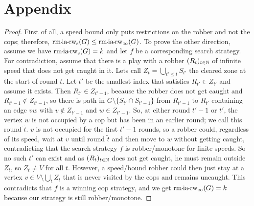 \section{Appendix}


\TheoremInvActRobbermonotonicity*
\begin{proof}
    First of all, a speed bound only puts restrictions on the robber and not the cops; therefore, $\rmiacopwidth{s}(G) \leq \rmiacopwidth{\infty}(G)$. To prove the other direction, assume we have $\rmiacopwidth{s}(G)=k$ and let $f$ be a corresponding search strategy. For contradiction, assume that there is a play with a robber $(R_t)_{t\in\mathbb{N}}$ of infinite speed that does not get caught in it. Lets call $Z_t = \bigcup_{t'\leq t}S_{t'}$ the cleared zone at the start of round $t$. Let $t'$ be the smallest index that satisfies $R_{t'} \in Z_{t'}$ and assume it exists. Then $R_{t'} \in Z_{t'-1}$, because the robber does not get caught and $R_{t'-1} \notin Z_{t'-1}$, so there is path in $G\setminus \{S_{t'} \cap S_{t'-1}\}$ from $R_{t'-1}$ to $R_{t'}$ containing an edge $vw$ with $v\notin Z_{t'-1}$ and $w\in Z_{t'-1}$.
    So, at either round $t'-1$ or $t'$, the vertex $w$ is not occupied by a cop but has been in an earlier round; we call this round $\tilde{t}$. $v$ is not occupied for the first $t'-1$ rounds, so a robber could, regardless of its speed, wait at $v$ until round $\tilde{t}$ and then move to $w$ without getting caught, contradicting that the search strategy $f$ is robber\-/monotone for finite speeds. So no such $t'$ can exist and as $(R_t)_{t\in\mathbb{N}}$ does not get caught, he must remain outside $Z_t$, so $Z_t \neq V$ for all $t$. However, a speed\-/bound robber could then just stay at a vertex $v\in V\setminus \bigcup_{t}Z_{t}$ that is never visited by the cops and remains uncaught. This contradicts that $f$ is a winning cop strategy, and we get $\rmiacopwidth{\infty}(G)=k$ because our strategy is still robber\-/monotone.
\end{proof}

